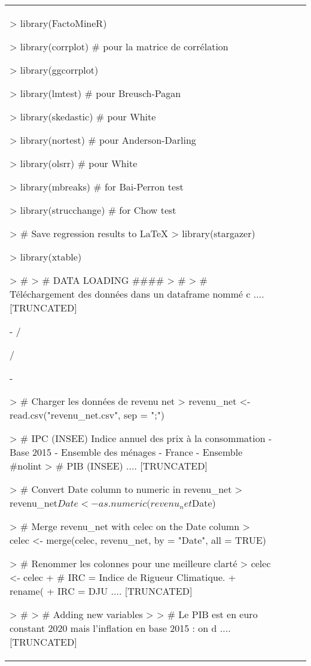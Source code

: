 \begin{table}[h]
\begin{tabular}{lccc}
> library(FactoMineR)

> library(corrplot) # pour la matrice de corrélation

> library(ggcorrplot)

> library(lmtest) # pour Breusch-Pagan

> library(skedastic) # pour White

> library(nortest) # pour Anderson-Darling

> library(olsrr) # pour White

> library(mbreaks) # for Bai-Perron test

> library(strucchange) # for Chow test

> # Save regression results to LaTeX
> library(stargazer)

> library(xtable)

> # %
> # DATA LOADING ####
> # %
> # Téléchargement des données dans un dataframe nommé c .... [TRUNCATED] 

-
/
                                                                                                   

/
                                                                                                   

-
                                                                                                   
> # Charger les données de revenu net
> revenu_net <- read.csv("revenu_net.csv", sep = ";")

> # IPC   (INSEE)	         Indice annuel des prix à la consommation - Base 2015 - Ensemble des ménages - France - Ensemble #nolint
> # PIB   (INSEE)	  .... [TRUNCATED] 

> # Convert Date column to numeric in revenu_net
> revenu_net$Date <- as.numeric(revenu_net$Date)

> # Merge revenu_net with celec on the Date column
> celec <- merge(celec, revenu_net, by = "Date", all = TRUE)

> # Renommer les colonnes pour une meilleure clarté
> celec <- celec %
+     # IRC = Indice de Rigueur Climatique.
+     rename(
+         IRC = DJU .... [TRUNCATED] 

> # %
> # Adding new variables
> 
> # Le PIB est en euro constant 2020 mais l'inflation en base 2015 : on d .... [TRUNCATED] 


\end{tabular}
\end{table}
